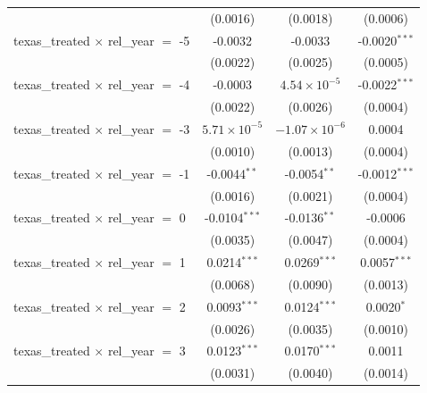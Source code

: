 \begin{tabular}{lccc}
                                                & (0.0016)              & (0.0018)               & (0.0006)\\   
   texas\_treated $\times$ rel\_year $=$ -5     & -0.0032               & -0.0033                & -0.0020$^{***}$\\   
                                                & (0.0022)              & (0.0025)               & (0.0005)\\   
   texas\_treated $\times$ rel\_year $=$ -4     & -0.0003               & $4.54\times 10^{-5}$   & -0.0022$^{***}$\\   
                                                & (0.0022)              & (0.0026)               & (0.0004)\\   
   texas\_treated $\times$ rel\_year $=$ -3     & $5.71\times 10^{-5}$  & $-1.07\times 10^{-6}$  & 0.0004\\   
                                                & (0.0010)              & (0.0013)               & (0.0004)\\   
   texas\_treated $\times$ rel\_year $=$ -1     & -0.0044$^{**}$        & -0.0054$^{**}$         & -0.0012$^{***}$\\   
                                                & (0.0016)              & (0.0021)               & (0.0004)\\   
   texas\_treated $\times$ rel\_year $=$ 0      & -0.0104$^{***}$       & -0.0136$^{**}$         & -0.0006\\   
                                                & (0.0035)              & (0.0047)               & (0.0004)\\   
   texas\_treated $\times$ rel\_year $=$ 1      & 0.0214$^{***}$        & 0.0269$^{***}$         & 0.0057$^{***}$\\   
                                                & (0.0068)              & (0.0090)               & (0.0013)\\   
   texas\_treated $\times$ rel\_year $=$ 2      & 0.0093$^{***}$        & 0.0124$^{***}$         & 0.0020$^{*}$\\   
                                                & (0.0026)              & (0.0035)               & (0.0010)\\   
   texas\_treated $\times$ rel\_year $=$ 3      & 0.0123$^{***}$        & 0.0170$^{***}$         & 0.0011\\   
                                                & (0.0031)              & (0.0040)               & (0.0014)\\   

\end{tabular}
